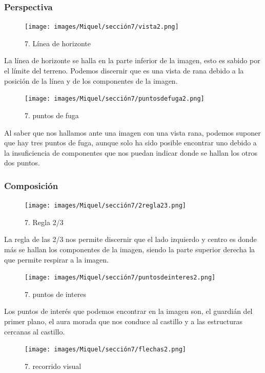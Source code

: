 \documentclass[12pt]{article}
\begin{document}
        \subsubsection{Perspectiva}

    \begin{figure}[H]
      \centering
      \texttt{[image: images/Miquel/sección7/vista2.png]}
      \caption{\small 7. Línea de horizonte}
    \end{figure}

    La línea de horizonte se halla en la parte inferior de la imagen, esto es sabido por el límite del terreno. Podemos discernir que es una vista de rana debido a la posición de la línea y de los componentes de la imagen.
    
    \begin{figure}[H]
      \centering
      \texttt{[image: images/Miquel/sección7/puntosdefuga2.png]}
      \caption{\small 7. puntos de fuga}
    \end{figure}

    Al saber que nos hallamos ante una imagen con una vista rana, podemos suponer que hay tres puntos de fuga, aunque solo ha sido posible encontrar uno debido a la insuficiencia de componentes que nos puedan indicar donde se hallan los otros dos puntos.

        \subsubsection{Composición}
    \begin{figure}[H]
      \centering
      \texttt{[image: images/Miquel/sección7/2regla23.png]}
      \caption{\small 7. Regla 2/3}
    \end{figure}
    
    La regla de las 2/3 nos permite discernir que el lado izquierdo y centro es donde más se hallan los componentes de la imagen, siendo la parte superior derecha la que permite respirar a la imagen.

    \begin{figure}[H]
      \centering
      \texttt{[image: images/Miquel/sección7/puntosdeinteres2.png]}
      \caption{\small 7. puntos de interes}
    \end{figure}

    Los puntos de interés que podemos encontrar en la imagen son, el guardián del primer plano, el aura morada que nos conduce al castillo y a las estructuras cercanas al castillo.

    \begin{figure}[H]
      \centering
      \texttt{[image: images/Miquel/sección7/flechas2.png]}
      \caption{\small 7. recorrido visual}
    \end{figure}
\end{document}

